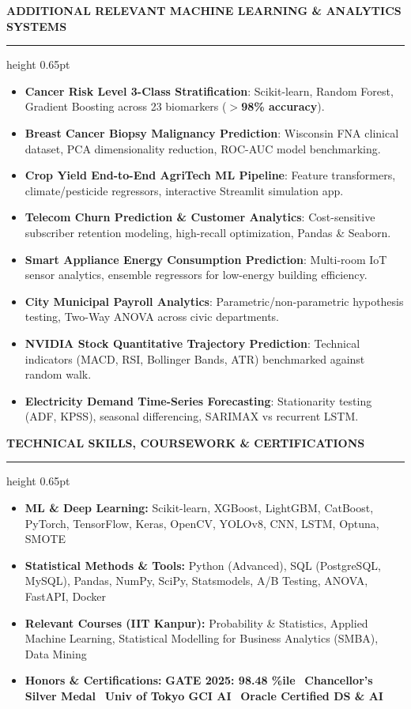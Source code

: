 \documentclass[10pt]{article}
\newcommand{\resumesection}[1]{%
  \vspace{2pt}%
  {\large \textbf{\uppercase{#1}}}%
  \vspace{1pt}%
  \hrule height 0.65pt%
  \vspace{1.5pt}%
}
\begin{document}
\resumesection{Additional Relevant Machine Learning \& Analytics Systems}

\begin{itemize}[noitemsep, topsep=1pt, partopsep=0pt, parsep=0pt]
    \item \textbf{Cancer Risk Level 3-Class Stratification}: Scikit-learn, Random Forest, Gradient Boosting across 23 biomarkers (\textbf{$>$98\% accuracy}).
    \item \textbf{Breast Cancer Biopsy Malignancy Prediction}: Wisconsin FNA clinical dataset, PCA dimensionality reduction, ROC-AUC model benchmarking.
    \item \textbf{Crop Yield End-to-End AgriTech ML Pipeline}: Feature transformers, climate/pesticide regressors, interactive Streamlit simulation app.
    \item \textbf{Telecom Churn Prediction \& Customer Analytics}: Cost-sensitive subscriber retention modeling, high-recall optimization, Pandas \& Seaborn.
    \item \textbf{Smart Appliance Energy Consumption Prediction}: Multi-room IoT sensor analytics, ensemble regressors for low-energy building efficiency.
    \item \textbf{City Municipal Payroll Analytics}: Parametric/non-parametric hypothesis testing, Two-Way ANOVA across civic departments.
    \item \textbf{NVIDIA Stock Quantitative Trajectory Prediction}: Technical indicators (MACD, RSI, Bollinger Bands, ATR) benchmarked against random walk.
    \item \textbf{Electricity Demand Time-Series Forecasting}: Stationarity testing (ADF, KPSS), seasonal differencing, SARIMAX vs recurrent LSTM.
\end{itemize}

\resumesection{Technical Skills, Coursework \& Certifications}

\begin{itemize}[noitemsep, topsep=1pt, partopsep=0pt, parsep=0pt]
    \item \textbf{ML \& Deep Learning:} Scikit-learn, XGBoost, LightGBM, CatBoost, PyTorch, TensorFlow, Keras, OpenCV, YOLOv8, CNN, LSTM, Optuna, SMOTE
    \item \textbf{Statistical Methods \& Tools:} Python (Advanced), SQL (PostgreSQL, MySQL), Pandas, NumPy, SciPy, Statsmodels, A/B Testing, ANOVA, FastAPI, Docker
    \item \textbf{Relevant Courses (IIT Kanpur):} Probability \& Statistics, Applied Machine Learning, Statistical Modelling for Business Analytics (SMBA), Data Mining
    \item \textbf{Honors \& Certifications:} \textbf{GATE 2025: 98.48 \%ile} \textbullet \ \textbf{Chancellor's Silver Medal} \textbullet \ \textbf{Univ of Tokyo GCI AI} \textbullet \ \textbf{Oracle Certified DS \& AI}
\end{itemize}
\end{document}
